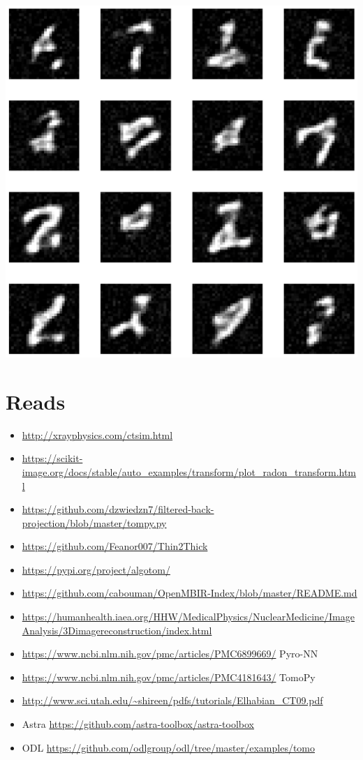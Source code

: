 \documentclass[a4paper, 11pt]{article}
\begin{document}
\begin{center}
\includegraphics[width=.9\linewidth]{./.ob-jupyter/0f3f0e54e530983abb7d269c4c35266ac2b88c7c.png}
\end{center}

\section{Reads}
\label{sec:org8e51bcd}
\begin{itemize}
\item \url{http://xrayphysics.com/ctsim.html}
\item \url{https://scikit-image.org/docs/stable/auto\_examples/transform/plot\_radon\_transform.html}
\item \url{https://github.com/dzwiedzn7/filtered-back-projection/blob/master/tompy.py}
\item \url{https://github.com/Feanor007/Thin2Thick}
\item \url{https://pypi.org/project/algotom/}
\item \url{https://github.com/cabouman/OpenMBIR-Index/blob/master/README.md}
\item \url{https://humanhealth.iaea.org/HHW/MedicalPhysics/NuclearMedicine/ImageAnalysis/3Dimagereconstruction/index.html}
\item \url{https://www.ncbi.nlm.nih.gov/pmc/articles/PMC6899669/} Pyro-NN
\item \url{https://www.ncbi.nlm.nih.gov/pmc/articles/PMC4181643/} TomoPy
\item \url{http://www.sci.utah.edu/\~shireen/pdfs/tutorials/Elhabian\_CT09.pdf}
\item Astra \url{https://github.com/astra-toolbox/astra-toolbox}
\item ODL \url{https://github.com/odlgroup/odl/tree/master/examples/tomo}
\end{itemize}
\end{document}
